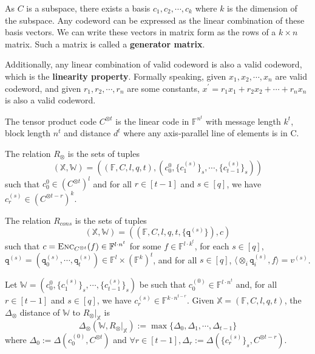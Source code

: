 As $C$ is a subspace, there exists a basis $c_1, c_2, \cdots, c_k$ where $k$ is the dimension of the subspace. Any codeword can be expressed as the linear combination of these basis vectors. We can write these vectors in matrix form as the rows of a $k \times n$ matrix. Such a matrix is called a \textbf{generator matrix}.

Additionally, any linear combination of valid codeword is also a valid codeword, which is the \textbf{linearity property}. Formally speaking, given $x_1, x_2, \cdots, x_n$ are valid codeword, and given $r_1, r_2, \cdots, r_n$ are some constants, $x^\prime = r_1 x_1 + r_2 x_2 + \cdots + r_n x_n$ is also a valid codeword.

\begin{definition}
The tensor product code $C^{\otimes t}$ is the linear code in $\mathbb{F}^{n^t}$ with message length $k^t$, block length $n^t$ and distance $d^t$ where any axis-parallel line of elements is in C.
\end{definition}

\begin{definition}
\label{def:relation-prox}
The relation $R_\otimes$ is the sets of tuples
$$
    (\mathbb{X}, \mathbb{W}) = ((\mathbb{F}, C, l, q, t), (c_0^{0}, \{c_1^{(s)}\}_s, \cdots, \{c_{t-1}^{(s)}\}_s))
$$ 
such that $c_0^{0} \in (C^{\otimes t})^l$ and for all $r \in [t-1]$ and $s \in [q]$, we have $c_r^{(s)} \in (C^{\otimes t-r})^k$.
\end{definition}

\begin{definition}
\label{def:relation-cons}
The relation $R_{cons}$ is the sets of tuples
$$
    (\mathbb{X}, \mathbb{W}) = ((\mathbb{F}, C, l, q, t, \{\texttt{q}^{(s)}\}), c)
$$ 
such that $c = \textsc{Enc}_{C^{\otimes t}}(f) \in \mathbb{F}^{l\cdot n^t}$ for some $f \in \mathbb{F}^{l\cdot k^t}$, 
for each $s \in [q]$, $\texttt{q}^{(s)} = (\texttt{q}_0^{(s)}, \cdots, \texttt{q}_t^{(s)}) \in \mathbb{F}^{l} \times (\mathbb{F}^k)^t$, 
and for all $s \in [q]$, $\langle \otimes_{i}\texttt{q}_i^{(s)} , f \rangle = v^{(s)}$.

\end{definition}

\begin{definition}
Let $\mathbb{W} = (c_0^{0}, \{c_1^{(s)}\}_s, \cdots, \{c_{t-1}^{(s)}\}_s)$ be such that $c_0^{(0)} \in \mathbb{F}^{l \cdot n^t}$ and, for all $r \in [t-1]$ and $s \in [q]$, we have $c_r^{(s)} \in \mathbb{F}^{k \cdot n^{t-r}}$. Given $\mathbb{X} = (\mathbb{F}, C, l, q, t)$, the $\Delta_\otimes$ distance of $\mathbb{W}$ to $R_\otimes|_{\mathbb{X}}$ is
$$
    \Delta_\otimes(\mathbb{W}, R_\otimes|_{\mathbb{X}}) := \max \{\Delta_0, \Delta_1, \cdots, \Delta_{t-1}\}
$$
where $\Delta_0 := \Delta(c_0^{(0)}, C^{\otimes t})$ and $\forall r \in [t-1], \Delta_r := \Delta(\{c_r^{(s)}\}_s, C^{\otimes t-r})$.
\end{definition}
